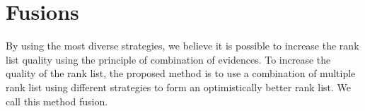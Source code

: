 \section{Fusions \label{sec:fusions}}

By using the most diverse strategies, we believe it is possible to increase the rank list quality using the principle of combination of evidences.
To increase the quality of the rank list, the proposed method is to use a combination of multiple rank list using different strategies to form an optimistically better rank list.
We call this method fusion.




